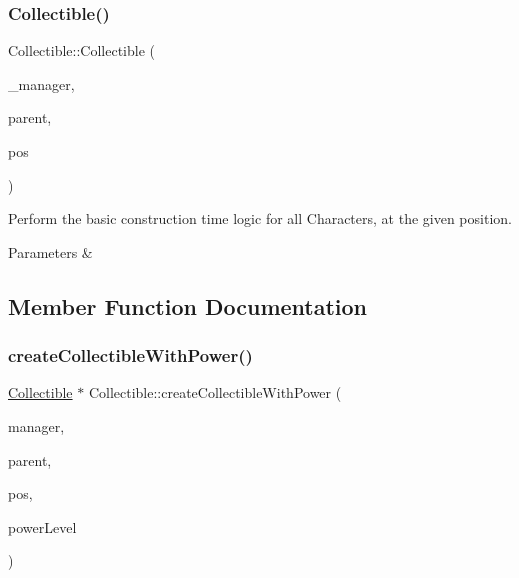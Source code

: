 \subsubsection{\texorpdfstring{Collectible()}{Collectible()}}
{\footnotesize\ttfamily Collectible\+::\+Collectible (\begin{DoxyParamCaption}\item[{\mbox{\hyperlink{class_game_manager}{Game\+Manager}} $\ast$}]{\+\_\+manager,  }\item[{\mbox{\hyperlink{class_game_entity}{Game\+Entity}} $\ast$}]{parent,  }\item[{\mbox{\hyperlink{classsf_1_1_vector2}{sf\+::\+Vector2f}}}]{pos }\end{DoxyParamCaption})}



Perform the basic construction time logic for all Characters, at the given position. 


\begin{DoxyParams}{Parameters}
{\em } & \\
\hline
\end{DoxyParams}


\subsection{Member Function Documentation}
\mbox{\label{class_collectible_a0b1b2f929eee25c69826efbd3e91916c}} 
\subsubsection{\texorpdfstring{createCollectibleWithPower()}{createCollectibleWithPower()}}
{\footnotesize\ttfamily \mbox{\hyperlink{class_collectible}{Collectible}} $\ast$ Collectible\+::create\+Collectible\+With\+Power (\begin{DoxyParamCaption}\item[{\mbox{\hyperlink{class_game_manager}{Game\+Manager}} $\ast$}]{manager,  }\item[{\mbox{\hyperlink{class_game_entity}{Game\+Entity}} $\ast$}]{parent,  }\item[{\mbox{\hyperlink{classsf_1_1_vector2}{sf\+::\+Vector2f}}}]{pos,  }\item[{float}]{power\+Level }\end{DoxyParamCaption})\hspace{0.3cm}{\ttfamily [static]}}



